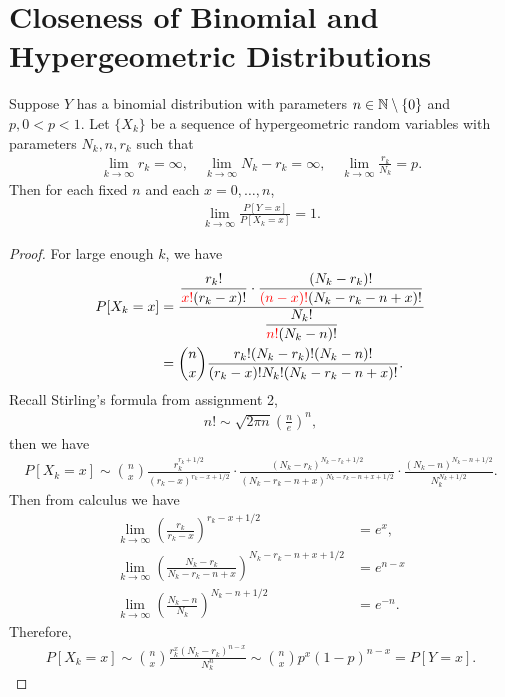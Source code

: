 \section*{Closeness of Binomial and Hypergeometric Distributions}

\begin{theorem}
	Suppose $Y$ has a binomial distribution with parameters $n\in \mathbb{N}\setminus\{0\}$ and $p, 0 < p < 1$. Let $\{X_k\}$ be a sequence of hypergeometric random variables with parameters $N_k, n, r_k$ such that
	\begin{align*}
	\lim_{k\rightarrow \infty} r_k = \infty, \quad \lim_{k\rightarrow \infty} N_k-r_k = \infty, \quad \lim_{k\rightarrow \infty} \frac{r_k}{N_k} = p.
	\end{align*}
	Then for each fixed $n$ and each $x = 0, \ldots, n$,
	\begin{align*}
	\lim_{k\rightarrow \infty} \frac{P[Y=x]}{P[X_k=x]} = 1.
	\end{align*}
\end{theorem}
\begin{proof}
	For large enough $k$, we have
	\begin{align*}
	P[X_k = x] & = \frac{\dfrac{r_k!}{\red{x!}(r_k-x)!}\cdot \dfrac{(N_k-r_k)!}{\red{(n-x)!}(N_k-r_k-n+x)!}}{\dfrac{N_k!}{\red{n!}(N_k-n)!}} \\
	& = \binom{n}{x} \frac{r_k!(N_k-r_k)!(N_k-n)!}{(r_k-x)!N_k!(N_k-r_k-n+x)!}.
	\end{align*}
	Recall Stirling's formula from assignment 2, 
	\begin{align*}
	n!\sim \sqrt{2\pi n}\left(\frac{n}{e} \right)^n,
	\end{align*}
	then we have
	\begin{align*}
	P[X_k=x] \sim \binom{n}{x} \frac{r_k^{r_k+1/2}}{(r_k-x)^{r_k-x+1/2}}\cdot \frac{(N_k-r_k)^{N_k-r_k+1/2}}{(N_k-r_k-n+x)^{N_k-r_k-n+x+1/2}} \cdot \frac{(N_k-n)^{N_k-n+1/2}}{N_k^{N_k+1/2}}.
	\end{align*}
	Then from calculus we have
	\begin{align*}
	\lim_{k\rightarrow \infty} \left(\frac{r_k}{r_k-x} \right)^{r_k-x+1/2} & = e^x,\\
	\lim_{k\rightarrow \infty} \left(\frac{N_k-r_k}{N_k-r_k-n+x} \right)^{N_k-r_k-n+x+1/2} & = e^{n-x} \\
	\lim_{k\rightarrow \infty} \left(\frac{N_k-n}{N_k} \right)^{N_k-n+1/2} & = e^{-n}.
	\end{align*}
	Therefore,
	\begin{align*}
	P[X_k = x] \sim \binom{n}{x} \frac{r_k^x(N_k-r_k)^{n-x}}{N_k^n} \sim \binom{n}{x} p^x(1-p)^{n-x} = P[Y = x].
	\end{align*}
\end{proof}


